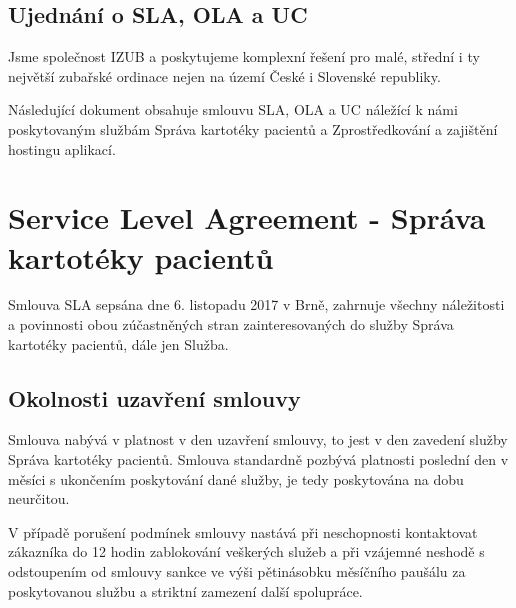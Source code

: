 \documentclass[11pt, a4paper, titlepage]{article}
\begin{document}
	
	\pagestyle{fancy}

	\begin{center}
		\section*{Ujednání o SLA, OLA a UC}
	\end{center}

	\noindent Jsme společnost IZUB a poskytujeme komplexní řešení pro malé, střední i ty největší zubařské ordinace nejen na území České i Slovenské republiky.

	\noindent Následující dokument obsahuje smlouvu SLA, OLA a UC náležící k námi poskytovaným službám Správa kartotéky pacientů a Zprostředkování a zajištění hostingu aplikací.

	\noindent\makebox[\linewidth]{\rule{17.5cm}{0.4pt}}

	\vspace {1.5em}

	\section{Service Level Agreement - Správa kartotéky pacientů}

	Smlouva SLA sepsána dne 6. listopadu 2017 v Brně, zahrnuje všechny náležitosti a povinnosti obou zúčastněných stran zainteresovaných do služby Správa kartotéky pacientů, dále jen Služba.

	\subsection*{Okolnosti uzavření smlouvy}

	\noindent Smlouva nabývá v platnost v den uzavření smlouvy, to jest v den zavedení služby Správa kartotéky pacientů. Smlouva standardně pozbývá platnosti poslední den v měsíci s ukončením poskytování dané služby, je tedy poskytována na dobu neurčitou.

	\noindent V případě porušení podmínek smlouvy nastává při neschopnosti kontaktovat zákazníka do 12 hodin zablokování veškerých služeb a při vzájemné neshodě s odstoupením od smlouvy sankce ve výši pětinásobku měsíčního paušálu za poskytovanou službu a striktní zamezení další spolupráce.
\end{document}

